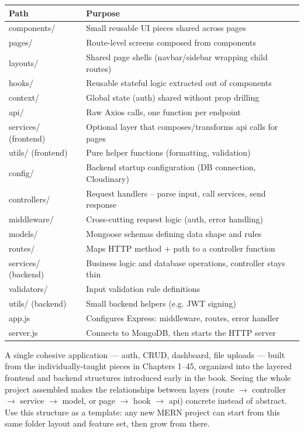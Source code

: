 \begin{tabularx}{\textwidth}{@{}>{\ttfamily}p{3.2cm}X@{}}
\toprule
Path & Purpose \\
\midrule
components/ & Small reusable UI pieces shared across pages \\
pages/ & Route-level screens composed from components \\
layouts/ & Shared page shells (navbar/sidebar wrapping child routes) \\
hooks/ & Reusable stateful logic extracted out of components \\
context/ & Global state (auth) shared without prop drilling \\
api/ & Raw Axios calls, one function per endpoint \\
services/ (frontend) & Optional layer that composes/transforms api calls
for pages \\
utils/ (frontend) & Pure helper functions (formatting, validation) \\
config/ & Backend startup configuration (DB connection, Cloudinary) \\
controllers/ & Request handlers -- parse input, call services, send
response \\
middleware/ & Cross-cutting request logic (auth, error handling) \\
models/ & Mongoose schemas defining data shape and rules \\
routes/ & Maps HTTP method + path to a controller function \\
services/ (backend) & Business logic and database operations, controller
stays thin \\
validators/ & Input validation rule definitions \\
utils/ (backend) & Small backend helpers (e.g. JWT signing) \\
app.js & Configures Express: middleware, routes, error handler \\
server.js & Connects to MongoDB, then starts the HTTP server \\
\bottomrule
\end{tabularx}

\whatwhyhow
{A single cohesive application --- auth, CRUD, dashboard, file uploads ---
built from the individually-taught pieces in Chapters 1--45, organized
into the layered frontend and backend structures introduced early in the
book.}
{Seeing the whole project assembled makes the relationships between
layers (route $\to$ controller $\to$ service $\to$ model, or page $\to$
hook $\to$ api) concrete instead of abstract.}
{Use this structure as a template: any new MERN project can start from
this same folder layout and feature set, then grow from there.}
